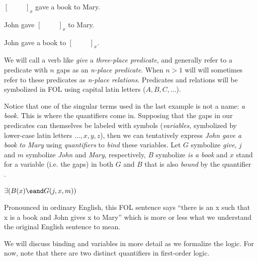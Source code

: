 \begin{argument}
\item[ ] $[\hspace{1cm}]_x$ gave a book to Mary.
\item[ ] John gave $[\hspace{1cm}]_x$ to Mary.
\item[ ] John gave a book to $[\hspace{1cm}]_x$.  
\end{argument}

We will call a verb like \emph{give} a \emph{three-place predicate}, and
generally refer to a predicate with $n$ gaps as an \emph{n-place predicate}.
When $n>1$ will will sometimes refer to these predicates as \emph{n-place
relations}. Predicates and relations will be symbolized in FOL using capital
latin letters ($A,B,C,\dots$).

Notice that one of the singular terms used in the last example is not a name:
\emph{a book}. This is where the quantifiers come in. Supposing that the gaps
in our predicates can themselves be labeled with symbols (\emph{variables},
symbolized by lower-case latin letters $\dots,x,y,z$), then we can tentatively
express \emph{John gave a book to Mary} using \emph{quantifiers} to \emph{bind}
these variables. Let $G$ symbolize \emph{give}, $j$ and $m$ symbolize
\emph{John} and \emph{Mary}, respectively, $B$ symbolize \emph{is a book} and
$x$ stand for a variable (i.e. the gaps) in both $G$ and $B$ that is also
\emph{bound} by the quantifier \eexists.

\begin{argument}
\item[ ] $\exists(B(x)\eand G(j,x,m))$
\end{argument}

Pronounced in ordinary English, this FOL sentence says ``there is an x such that
x is a book and John gives x to Mary'' which is more or less what we understand
the original English sentence to mean.


We will discuss binding and variables in
more detail as we formalize the logic. For now, note that there are two distinct
quantifiers in first-order logic.

